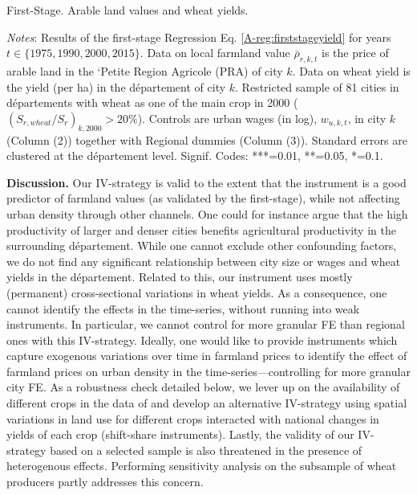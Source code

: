 \documentclass[11pt]{report}
\newcommand{\datatables}{../output/data/tables}
\begin{document}
\begin{table}[h!]
	\begin{center}
	
		\caption{First-Stage. Arable land values and wheat yields.\label{A-tab:1SLSyield}}
	\end{center}
	{\footnotesize \textit{Notes}: Results of the first-stage Regression Eq. \ref{A-reg:firststageyield} for years $t \in \{1975, 1990, 2000, 2015\}$. Data on local farmland value $\bar{\rho}_{r,k,t}$ is the price of arable land in the `Petite Region Agricole (PRA) of city $k$.  Data on wheat yield is the yield (per ha) in the département of city $k$. Restricted sample of 81 cities in départements with wheat as one of the main crop in 2000 ($(S_{r,wheat}/S_r)_{k,2000}>20\%$). Controls are urban wages (in log), $w_{u,k,t}$, in city $k$ (Column (2)) together with Regional dummies (Column (3)). Standard errors are clustered at the département level. Signif. Codes: ***=0.01, **=0.05, *=0.1.}
\end{table}

\noindent \textbf{Discussion.} Our IV-strategy is valid to the extent that the instrument is a good predictor of farmland values (as validated by the first-stage), while not affecting urban density through other channels. One could for instance argue that the high productivity of larger and denser cities benefits agricultural productivity in the surrounding département. While one cannot exclude other confounding factors, we do not find any significant relationship between city size or wages and wheat yields in the département. Related to this, our instrument uses mostly (permanent) cross-sectional variations in wheat yields. As a consequence, one cannot identify the effects in the time-series, without running into weak instruments. In particular, we cannot control for more granular FE than regional ones  with this IV-strategy. Ideally, one would like to provide instruments which capture exogenous variations over time in farmland prices to identify the effect of farmland prices on urban density in the time-series---controlling for more granular city FE. As a robustness check detailed below, we lever up on the availability of different crops in the data of \cite{schaubergeretal2022} and develop an alternative IV-strategy using spatial variations in land use for different crops interacted with national changes in yields of each crop (shift-share instruments). Lastly, the validity of our IV-strategy based on a selected sample is also threatened in the presence of heterogenous effects. Performing sensitivity analysis on the subsample of wheat producers partly addresses this concern. 
\end{document}
